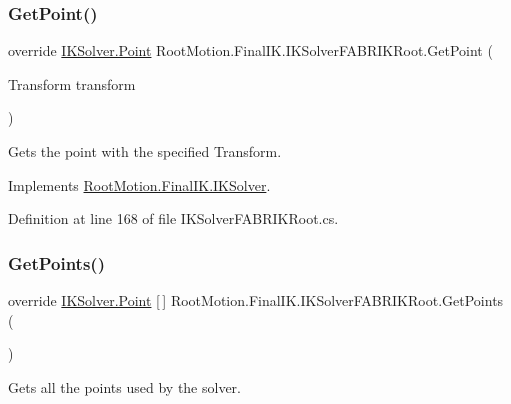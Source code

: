 \subsubsection{\texorpdfstring{Get\+Point()}{GetPoint()}}
{\footnotesize\ttfamily override \mbox{\hyperlink{class_root_motion_1_1_final_i_k_1_1_i_k_solver_1_1_point}{I\+K\+Solver.\+Point}} Root\+Motion.\+Final\+I\+K.\+I\+K\+Solver\+F\+A\+B\+R\+I\+K\+Root.\+Get\+Point (\begin{DoxyParamCaption}\item[{Transform}]{transform }\end{DoxyParamCaption})\hspace{0.3cm}{\ttfamily [virtual]}}



Gets the point with the specified Transform. 



Implements \mbox{\hyperlink{class_root_motion_1_1_final_i_k_1_1_i_k_solver_a8e845886025fb0ca404b85f6747f7281}{Root\+Motion.\+Final\+I\+K.\+I\+K\+Solver}}.



Definition at line 168 of file I\+K\+Solver\+F\+A\+B\+R\+I\+K\+Root.\+cs.

\mbox{\label{class_root_motion_1_1_final_i_k_1_1_i_k_solver_f_a_b_r_i_k_root_a386a3cb55b688ec13b8bb2299c0f2e75}} 
\subsubsection{\texorpdfstring{Get\+Points()}{GetPoints()}}
{\footnotesize\ttfamily override \mbox{\hyperlink{class_root_motion_1_1_final_i_k_1_1_i_k_solver_1_1_point}{I\+K\+Solver.\+Point}} \mbox{[}$\,$\mbox{]} Root\+Motion.\+Final\+I\+K.\+I\+K\+Solver\+F\+A\+B\+R\+I\+K\+Root.\+Get\+Points (\begin{DoxyParamCaption}{ }\end{DoxyParamCaption})\hspace{0.3cm}{\ttfamily [virtual]}}



Gets all the points used by the solver. 



